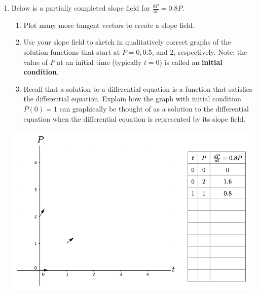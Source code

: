 \begin{enumerate}[resume]
\item Below is a partially completed slope field for  $\displaystyle \frac{dP}{dt}=0.8P$. \label{01problem7}
\begin{enumerate}
\item	Plot many more tangent vectors to create a slope field. \label{01problem7parta}
\item	Use your slope field to sketch in qualitatively correct graphs of the solution functions that start at $P = 0, 0.5$, and $2$, respectively. Note: the value of $P$ at an initial time (typically $t = 0$) is called an \textbf{initial condition}. \label{01problem7partb}
\item	Recall that a solution to a differential equation is a function that satisfies the differential equation. Explain how the graph with initial condition $P(0) = 1$ can graphically be thought of as a solution to the differential equation when the differential equation is represented by its slope field. \label{01problem7partc}
\end{enumerate}

\begin{center}
\includegraphics[width=6in]{01/01MyFirstSlopeFieldwithTable.png}
\end{center}

\clearpage


\end{enumerate}
